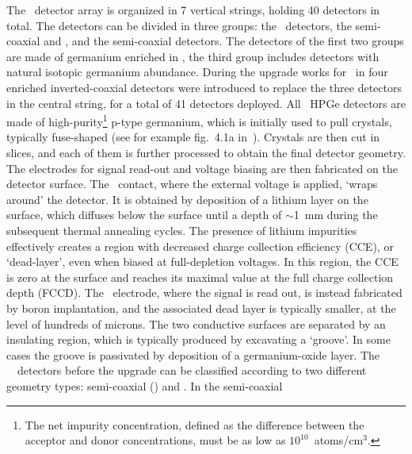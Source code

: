 The \gerdatwo\ detector array is organized in 7 vertical strings, holding 40 detectors in
total. The detectors can be divided in three groups: the \bege\ detectors, the
semi-coaxial  and , and the semi-coaxial  detectors. The detectors of
the first two groups are made of germanium enriched in \gesix, the third group includes
detectors with natural isotopic germanium abundance. During the upgrade works for
\phasetwop\ in  four enriched inverted-coaxial \IC{} detectors were introduced to
replace the three \GTF{} detectors in the central string, for a total of 41 detectors
deployed.
\newpar
All \gerda\ HPGe detectors are made of high-purity\footnote{The net impurity
concentration, defined as the difference between the acceptor and donor concentrations,
must be as low as $10^{10}$~atoms/cm$^3$.} p-type germanium, which is initially
used to pull crystals, typically fuse-shaped (see for example fig.~4.1a
in~\cite{Yonenaga2019}).  Crystals are then cut in slices, and each of them is further
processed to obtain the final detector geometry. The electrodes for signal read-out and
voltage biasing are then fabricated on the detector surface. The \nplus\ contact, where the
external voltage is applied, `wraps around' the detector. It is obtained by deposition of
a lithium layer on the surface, which diffuses below the surface until a depth of
$\sim$1~mm during the subsequent thermal annealing cycles. The presence of lithium
impurities effectively creates a region with decreased charge collection efficiency (CCE),
or `dead-layer', even when biased at full-depletion voltages.  In this region, the CCE is
zero at the surface and reaches its maximal value at the full charge collection depth
(FCCD). The \pplus\ electrode, where the signal is read out, is instead fabricated by boron
implantation, and the associated dead layer is typically smaller, at the level of
hundreds of microns. The two conductive surfaces are separated by an insulating region,
which is typically produced by excavating a `groove'. In some cases the groove is
passivated by deposition of a germanium-oxide layer.
\newpar
{}
The \gerda\ \phasetwo\ detectors before the  upgrade can be classified according
to two different geometry types: semi-coaxial (\scoax) and \bege. In the semi-coaxial
